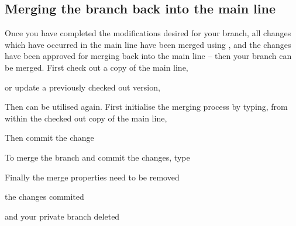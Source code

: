 \subsection{Merging the branch back into the main line}

Once you have completed the modifications desired for your branch, all changes which have occurred in the main line have been merged using , and the changes have been approved for merging back into the main line -- then your branch can be merged.  First check out a copy of the main line,


or update a previously checked out version,


Then  can be utilised again.  First initialise the merging process by typing, from within the checked out copy of the main line, 


Then commit the change


To merge the branch and commit the changes, type



Finally the merge properties need to be removed


the changes commited


and your private branch deleted





